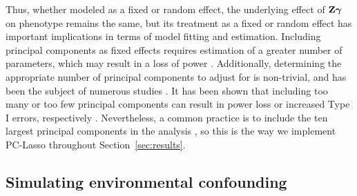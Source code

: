 Thus, whether modeled as a fixed or random effect, the underlying effect of $\textbf{Z} \boldsymbol{\gamma}$ on phenotype remains the same, but its treatment as a fixed or random effect has important implications in terms of model fitting and estimation. Including principal components as fixed effects requires estimation of a greater number of parameters, which may result in a loss of power \cite{zhang2015principal}. Additionally, determining the appropriate number of principal components to adjust for is non-trivial, and has been the subject of numerous studies \cite{patterson2006population, zhao2018practical}. It has been shown that including too many or too few principal components can result in power loss or increased Type I errors, respectively \cite{zhang2015principal}. Nevertheless, a common practice is to include the ten largest principal components in the analysis \citep{zhao2018practical}, so this is the way we implement PC-Lasso throughout Section~\ref{sec:results}.


\subsection{Simulating environmental confounding}

